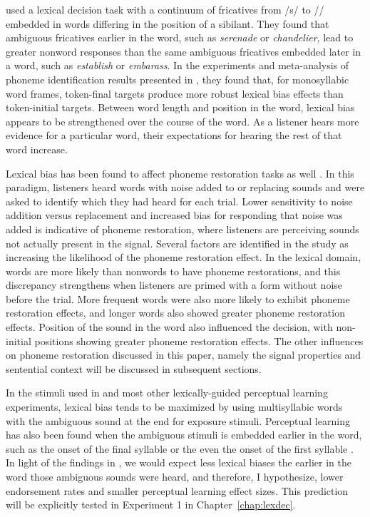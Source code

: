 \citet{Pitt2012} used a lexical decision task with a continuum of fricatives from /s/ to /\textesh/ embedded in words differing in the position of a sibilant.  
They found that ambiguous fricatives earlier in the word, such as \emph{serenade} or \emph{chandelier}, lead to greater nonword responses than the same ambiguous fricatives embedded later in a word, such as \emph{establish} or \emph{embarass}.  
In the experiments and meta-analysis of phoneme identification results presented in \citet{Pitt1993}, they found that, for monosyllabic word frames, token-final targets produce more robust lexical bias effects than token-initial targets.
Between word length and position in the word, lexical bias appears to be strengthened over the course of the word.
As a listener hears more evidence for a particular word, their expectations for hearing the rest of that word increase.

Lexical bias has been found to affect phoneme restoration tasks as well \citep{Samuel1981}.  
In this paradigm, listeners heard words with noise added to or replacing sounds and were asked to identify which they had heard for each trial.  
Lower sensitivity to noise addition versus replacement and increased bias for responding that noise was added is indicative of phoneme restoration, where listeners are perceiving sounds not actually present in the signal.  
Several factors are identified in the study as increasing the likelihood of the phoneme restoration effect.
In the lexical domain, words are more likely than nonwords to have phoneme restorations, and this discrepancy strengthens when listeners are primed with a form without noise before the trial.  
More frequent words were also more likely to exhibit phoneme restoration effects, and longer words also showed greater phoneme restoration effects.  
Position of the sound in the word also influenced the decision, with non-initial positions showing greater phoneme restoration effects. 
The other influences on phoneme restoration discussed in this paper, namely the signal properties and sentential context will be discussed in subsequent sections.

In the stimuli used in \citet{Norris2003} and most other lexically-guided perceptual learning experiments, lexical bias tends to be maximized by using multisyllabic words with the ambiguous sound at the end for exposure stimuli.  
Perceptual learning has also been found when the ambiguous stimuli is embedded earlier in the word, such as the onset of the final syllable \citep{Kraljic2005, Kraljic2008, Kraljic2008a} or the even the onset of the first syllable \citep{Clare2014}.  
In light of the findings in \citet{Pitt2012}, we would expect less lexical biases the earlier in the word those ambiguous sounds were heard, and therefore, I hypothesize, lower endorsement rates and smaller perceptual learning effect sizes.  
This prediction will be explicitly tested in Experiment 1 in Chapter~\ref{chap:lexdec}.

